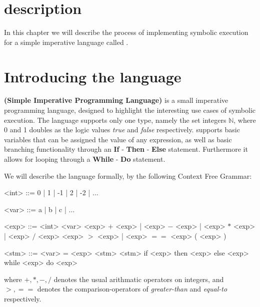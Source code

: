 \section{description}

In this chapter we will describe the process of implementing symbolic execution for a simple imperative language called \simpl.

\section{Introducing the \simpl language}

\simpl\textbf{(Simple Imperative Programming Language)} is a small imperative programming language, designed to highlight the interesting use cases of symbolic execution. The language supports only one type, namely the set integers $\mathbb{N}$, where 0 and 1 doubles as the logic values \emph{true} and \emph{false} respectively. \simpl supports basic
 variables that can be assigned the value of any expression, as well as basic branching functionality through an \textbf{If} - \textbf{Then} - \textbf{Else} statement. Furthermore it allows for looping through a \textbf{While} - \textbf{Do} statement.

We will describe the language formally, by the following Context Free Grammar:

\newpage
\begin{grammar}
	<int> ::= 0 | 1 | -1 | 2 | -2 | $\ldots$
	
	<var> ::= a | b | c | $\ldots$ 
	
	<exp> ::= <int>
	\alt <var>
	\alt <exp> $+$ <exp> | <exp> $-$ <exp> | <exp> $*$ <exp> | <exp> $/$ <exp>
	\alt <exp> $>$ <exp> | <exp> $==$ <exp> 
	\alt ( <exp> )	
	
	<stm> ::= <var> = <exp>
	\alt <stm> <stm>
	\alt if <exp> then <exp> else <exp>
	\alt while <exp> do <exp>
	\alt 
	
\end{grammar}

where $+, *, -, /$ denotes the usual arithmatic operators on integers, and $>, ==$ denotes the comparison-operators of \emph{greater-than} and \emph{equal-to} respectively.